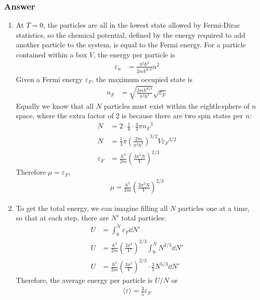 \subsubsection{Answer}
\begin{enumerate}
	\item
		At $T = 0$, the particles are all in the lowest state allowed by
		Fermi-Dirac statistics, so the chemical potential, defined by the
		energy required to add another particle to the system, is equal to the
		Fermi energy. For a particle contained within a box $V$, the energy
		per particle is
		\begin{align*}
			\varepsilon _n &= \frac{{\pi}^2{\hbar}^2}{2mV^{2/3}} n^2
		\end{align*}
		Given a Fermi energy $\varepsilon _F$, the maximum occupied state is
		\begin{align*}
			n_F &= \sqrt{\frac{2mV^{2/3}}{{\pi}^2{\hbar}^2}} \sqrt{\varepsilon _F}
		\end{align*}
		Equally we know that all $N$ particles must exist within the
		eighth-sphere of $n$ space, where the extra factor of 2 is because
		there are two spin states per $n$:
		\begin{align*}
			N &= 2{\cdot}\frac 18\cdot \frac 43 {\pi}{n_F}^3  \\
			N &= \frac 13 {\pi} ( \frac{2m}{{\pi}^2{\hbar}^2} )^{3/2} V {\varepsilon _F}^{3/2} \\
			\varepsilon _F &= \frac{{\hbar}^2}{2m} (\frac{3{\pi}^2N}{V})^{2/3}
		\end{align*}
		Therefore ${\mu} = \varepsilon _F$,
		\begin{align}
			\boxed{
			{\mu} = \frac{{\hbar}^2}{2m} (\frac{3{\pi}^2N}{V})^{2/3}
			}
		\end{align}
	\item
		To get the total energy, we can imagine filling all $N$ particles one
		at a time, so that at each step, there are $N'$ total particles:
		\begin{align*}
			U &= \int_0^N \varepsilon _F \dd N' \\
			U &= \frac{{\hbar}^2}{2m} (\frac{3{\pi}^2}{V})^{2/3} \int_0^N N^{2/3} \dd N' \\
			U &= \frac{{\hbar}^2}{2m} (\frac{3{\pi}^2}{V})^{2/3}\cdot \frac 35 N^{5/3} \dd N'
		\end{align*}
		Therefore, the average energy per particle is $U/N$ or
		\begin{align}
			\boxed{
			\langle \varepsilon  \rangle = \frac 35 \varepsilon _F
			}
		\end{align}

\end{enumerate}
